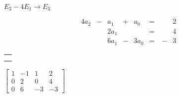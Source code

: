 \hspace{-0.2in}
\begin{minipage}{0.7in}
\vspace{0.6in}
{\tiny $E_3-4E_1\to E_3$}
\end{minipage}
\hspace{-0.1in}
\begin{minipage}{1.8in}
\vspace{-0.1in}
\begin{alignat*}{4}
{}a_2	&{}-{} 	&{}a_1 		&{}+{}	&{}a_0 	&{}= & \ {}&2   \\
{}	 		&{}		&2a_1 		&{}		&{}	 	&{}= & \ {}&4   \\
{} 		&{} 		&6a_1 		&{}-{} 	&3a_0 	&{}= & \ {-}&3
\end{alignat*} 
\end{minipage}
\begin{minipage}{2.35in}
\begin{center}
\renewcommand{\arraystretch}{1.2}
\begin{tabular}{r} \\ \\ \hspace{0.0in}{\tiny $R_3-4R_1\to R_3$} \end{tabular} \hspace{-0.1in}$\left[ \begin{array}{rrr|r} 1 	 &-1 	&1 &2 	\\ 0	&2		&0 &4	\\ 0	&6		&-3 &-3 \end{array} \right]$
\end{center}
\end{minipage}


